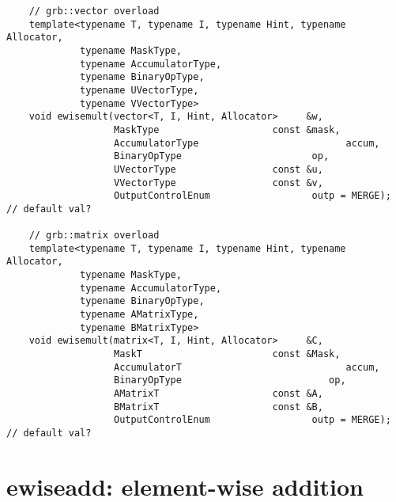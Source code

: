 \begin{verbatim}
    // grb::vector overload
    template<typename T, typename I, typename Hint, typename Allocator,
             typename MaskType,
             typename AccumulatorType,
             typename BinaryOpType,
             typename UVectorType,
             typename VVectorType>
    void ewisemult(vector<T, I, Hint, Allocator>     &w,
                   MaskType                    const &mask,
                   AccumulatorType                          accum,
                   BinaryOpType                       op,
                   UVectorType                 const &u,
                   VVectorType                 const &v,
                   OutputControlEnum                  outp = MERGE);  // default val?

    // grb::matrix overload
    template<typename T, typename I, typename Hint, typename Allocator,
             typename MaskType,
             typename AccumulatorType,
             typename BinaryOpType,
             typename AMatrixType,
             typename BMatrixType>
    void ewisemult(matrix<T, I, Hint, Allocator>     &C,
                   MaskT                       const &Mask,
                   AccumulatorT                             accum,
                   BinaryOpType                          op,
                   AMatrixT                    const &A,
                   BMatrixT                    const &B,
                   OutputControlEnum                  outp = MERGE);  // default val?
\end{verbatim}


\section{{\sf ewiseadd}: element-wise addition}

\paragraph{\syntax}

